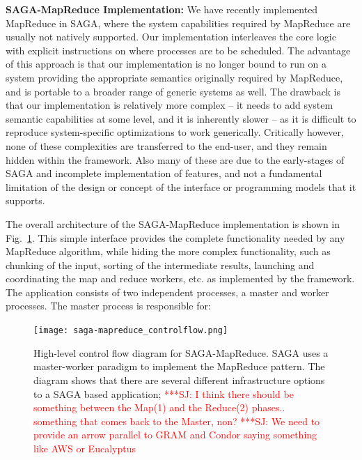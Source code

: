 \documentclass[conference,final]{IEEEtran}
\newcommand{\jhanote}[1]{ {\textcolor{red} { ***SJ: #1 }}}
\newcommand{\jhanote}[1]{}
\begin{document}
{\bf SAGA-MapReduce Implementation:} We have recently implemented
MapReduce in SAGA, where the system capabilities required by MapReduce
are usually not natively supported. Our implementation interleaves the
core logic with explicit instructions on where processes are to be
scheduled.  The advantage of this approach is that our implementation
is no longer bound to run on a system providing the appropriate
semantics originally required by MapReduce, and is portable to a
broader range of generic systems as well.  The drawback is that our
implementation is relatively more complex -- it needs to add system
semantic capabilities at some level, and it is inherently slower -- as
it is difficult to reproduce system-specific optimizations to work
generically.
Critically however, none of these complexities are transferred to the
end-user, and they remain hidden within the framework. Also many of
these are due to the early-stages of SAGA and incomplete
implementation of features, and not a fundamental limitation of the
design or concept of the interface or programming models that it
supports.

The overall architecture of the SAGA-MapReduce implementation is shown
in Fig.~\ref{saga-mapreduce_controlflow}. This simple interface
provides the complete functionality needed by any MapReduce algorithm,
while hiding the more complex functionality, such as chunking of the
input, sorting of the intermediate results, launching and coordinating
the map and reduce workers, etc. as implemented by the framework.  The
application consists of two independent processes, a master and worker
processes. The master process is responsible for:

\begin{figure}[t]
\centering
\texttt{[image: saga-mapreduce\_controlflow.png]}
\caption{High-level control flow diagram for SAGA-MapReduce. SAGA uses
  a master-worker paradigm to implement the MapReduce pattern. The
  diagram shows that there are several different infrastructure
  options to a SAGA based
  application; %
  \jhanote{I think there should be something between the Map(1) and
    the Reduce(2) phases.. something that comes back to the Master,
    non?} \jhanote{We need to provide an arrow parallel to GRAM and
    Condor saying something like AWS or Eucalyptus}} \vspace{-2em}
      \label{saga-mapreduce_controlflow}
\end{figure}
\end{document}
